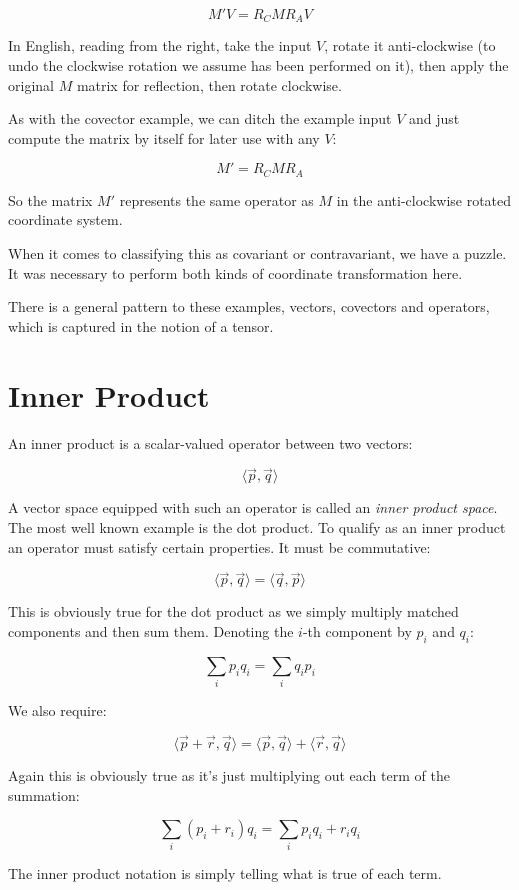 $$M'V = R_CMR_AV$$

In English, reading from the right, take the input $V$, rotate it anti-clockwise (to undo the clockwise rotation we assume has been performed on it), then apply the original $M$ matrix for reflection, then rotate clockwise.

As with the covector example, we can ditch the example input $V$ and just compute the matrix by itself for later use with any $V$:

$$M' = R_CMR_A$$

So the matrix $M'$ represents the same operator as $M$ in the anti-clockwise rotated coordinate system.

When it comes to classifying this as covariant or contravariant, we have a puzzle. It was necessary to perform both kinds of coordinate transformation here.

There is a general pattern to these examples, vectors, covectors and operators, which is captured in the notion of a tensor.

\section{Inner Product}

An inner product is a scalar-valued operator between two vectors:

$$\langle \vec{p},\vec{q}\rangle$$

A vector space equipped with such an operator is called an \textit{inner product space}. The most well known example is the dot product. To qualify as an inner product an operator must satisfy certain properties. It must be commutative:

$$\langle \vec{p},\vec{q}\rangle = \langle \vec{q},\vec{p}\rangle$$

This is obviously true for the dot product as we simply multiply matched components and then sum them. Denoting the $i$-th component by $p_i$ and $q_i$:

$$\sum_i p_i q_i = \sum_i q_i p_i$$

We also require:

$$\langle \vec{p}+\vec{r},\vec{q}\rangle = \langle \vec{p},\vec{q}\rangle + \langle \vec{r},\vec{q}\rangle$$

Again this is obviously true as it's just multiplying out each term of the summation:

$$\sum_i (p_i + r_i)q_i = \sum_i p_iq_i + r_iq_i$$

The inner product notation is simply telling what is true of each term.

